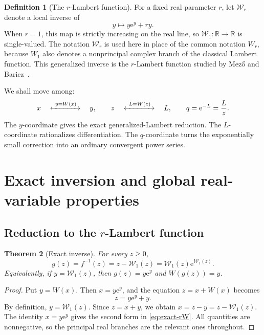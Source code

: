 \documentclass[11pt,a4paper]{article}
\numberwithin{equation}{section}
\newtheorem{theorem}{Theorem}[section]
\theoremstyle{definition}
\newtheorem{definition}[theorem]{Definition}
\theoremstyle{remark}
\newcommand{\e}{\mathrm e}
\newcommand{\rW}{\mathcal W}
\begin{document}
\begin{definition}[The \(r\)-Lambert function]
For a fixed real parameter \(r\), let \(\rW_r\) denote a local inverse of
\begin{equation}\label{eq:rW-def}
  y\longmapsto y\e^y+ry.
\end{equation}
When \(r=1\), this map is strictly increasing on the real line, so
\(\rW_1:\mathbb R\to\mathbb R\) is single-valued.  The notation
\(\rW_r\) is used here in place of the common notation \(W_r\), because
\(W_1\) also denotes a nonprincipal complex branch of the classical
Lambert function.  This generalized inverse is the \(r\)-Lambert function
studied by Mez\H{o} and Baricz~\cite{MezoBaricz2017}.
\end{definition}

We shall move among:
\[
 x \quad\xleftrightarrow{\ y=W(x)\ }\quad y,
 \qquad
 z \quad\xleftrightarrow{\ L=W(z)\ }\quad L,
 \qquad
 q=\e^{-L}=\frac{L}{z}.
\]
The \(y\)-coordinate gives the exact generalized-Lambert reduction.  The
\(L\)-coordinate rationalizes differentiation.  The \(q\)-coordinate
turns the exponentially small correction into an ordinary convergent power
series.

\section{Exact inversion and global real-variable properties}

\subsection[Reduction to the r-Lambert function]{Reduction to the \(r\)-Lambert function}

\begin{theorem}[Exact inverse]\label{thm:exact-inverse}
For every \(z\ge0\),
\begin{equation}\label{eq:exact-rW}
  g(z)=f^{-1}(z)=z-\rW_1(z)
       =\rW_1(z)\e^{\rW_1(z)}.
\end{equation}
Equivalently, if \(y=\rW_1(z)\), then \(g(z)=y\e^y\) and
\(W(g(z))=y\).
\end{theorem}

\begin{proof}
Put \(y=W(x)\).  Then \(x=y\e^y\), and the equation
\(z=x+W(x)\) becomes
\[
  z=y\e^y+y.
\]
By definition, \(y=\rW_1(z)\).  Since \(z=x+y\), we obtain
\(x=z-y=z-\rW_1(z)\).  The identity \(x=y\e^y\) gives the second form in
\eqref{eq:exact-rW}.  All quantities are nonnegative, so the principal real
branches are the relevant ones throughout.
\end{proof}
\end{document}
